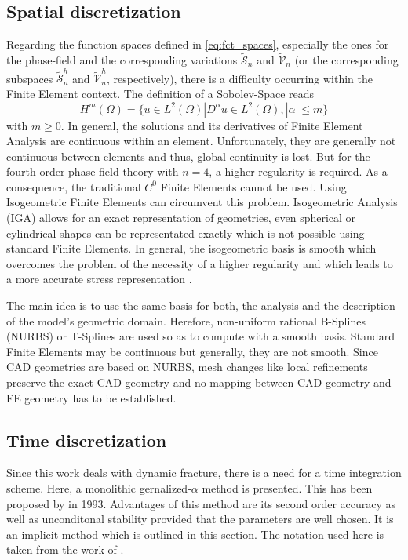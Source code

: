 \subsection{Spatial discretization} \label{sec:space_discr}
Regarding the function spaces defined in \eqref{eq:fct_spaces}, especially the ones for the phase-field and the corresponding variations $\tilde{\mathcal{S}}_{n}$ and $\tilde{\mathcal{V}}_{n}$ (or the corresponding subspaces $\tilde{\mathcal{S}}_{n}^{h}$ and $\tilde{\mathcal{V}}_{n}^{h}$, respectively), there is a difficulty occurring within the Finite Element context. The definition of a Sobolev-Space reads
\begin{equation} \label{eq:Hilbertspace}
	H^{m}\left(\Omega\right) = \{u\in L^{2}\left(\Omega\right)|D^{\alpha}u\in L^{2}\left(\Omega\right),|\alpha|\leq m\}
\end{equation}
with $m\geq0$. In general, the solutions and its derivatives of Finite Element Analysis are continuous within an element. Unfortunately, they are generally not continuous between elements and thus, global continuity is lost. But for the fourth-order phase-field theory with $n=4$, a higher regularity is required. As a consequence, the traditional $C^{0}$ Finite Elements cannot be used. Using Isogeometric Finite Elements can circumvent this problem. Isogeometric Analysis (IGA) allows for an exact representation of geometries, even spherical or cylindrical shapes can be representated exactly which is not possible using standard Finite Elements. In general, the isogeometric basis is smooth which overcomes the problem of the necessity of a higher regularity and which leads to a more accurate stress representation \cite{01_PF_dyn_brittle}.

The main idea is to use the same basis for both, the analysis and the description of the model's geometric domain. Herefore, non-uniform rational B-Splines (NURBS) or T-Splines are used so as to compute with a smooth basis. Standard Finite Elements may be continuous but generally, they are not smooth. Since CAD geometries are based on NURBS, mesh changes like local refinements preserve the exact CAD geometry and no mapping between CAD geometry and FE geometry has to be established. \citep{11_PF_DissBorden}

\hl{}


\subsection{Time discretization} \label{sec:time_discr}
Since this work deals with dynamic fracture, there is a need for a time integration scheme. Here, a monolithic gernalized-$\alpha$ method is presented. This has been proposed by \citet{10_PF_genAlpha} in 1993. Advantages of this method are its second order accuracy as well as unconditonal stability provided that the parameters are well chosen. It is an implicit method which is outlined in this section. The notation used here is taken from the work of \citet{01_PF_dyn_brittle}.

